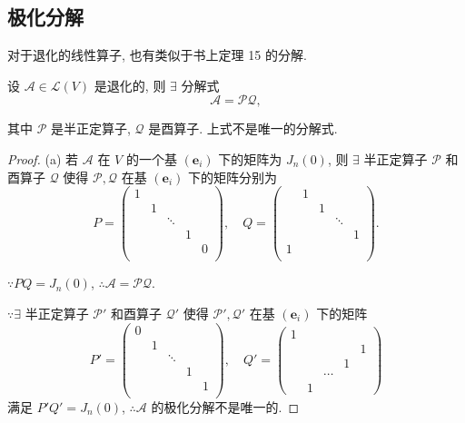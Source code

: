 \documentclass[color=black,device=normal,lang=cn,mode=geye]{elegantnote}
\begin{document}
\subsection{极化分解}
对于退化的线性算子, 也有类似于书上定理 15 的分解.
\begin{theorem}
    设 $\mathcal{A}\in\mathcal{L}(V)$ 是退化的, 则 $\exists$ 分解式
    \[\mathcal{A}=\mathcal{PQ},\]

    其中 $\mathcal{P}$ 是半正定算子, $\mathcal{Q}$ 是酉算子. 上式不是唯一的分解式.
\end{theorem}
\begin{proof}
    (a) 若 $\mathcal{A}$ 在 $V$ 的一个基 $(\boldsymbol{e}_i)$ 下的矩阵为 $J_n(0)$, 则 $\exists$ 半正定算子 $\mathcal{P}$ 和酉算子 $\mathcal{Q}$ 使得 $\mathcal{P},\mathcal{Q}$ 在基 $(\boldsymbol{e}_i)$ 下的矩阵分别为
    \[P=\begin{pmatrix}
        1 \\
        & 1 \\
        && \ddots \\
        &&& 1 \\
        &&&& 0 \\
    \end{pmatrix},\quad Q=\begin{pmatrix}
        & 1 \\
        && 1 \\
        &&& \ddots \\
        &&&& 1 \\
        1 \\
    \end{pmatrix}.\]

    $\because PQ=J_n(0)$, $\therefore\mathcal{A}=\mathcal{PQ}$.

    $\because\exists$ 半正定算子 $\mathcal{P}'$ 和酉算子 $\mathcal{Q}'$ 使得 $\mathcal{P}',\mathcal{Q}'$ 在基 $(\boldsymbol{e}_i)$ 下的矩阵
    \[P'=\begin{pmatrix}
        0 \\
        & 1 \\
        && \ddots \\
        &&& 1 \\
        &&&& 1 \\
    \end{pmatrix},\quad Q'=\begin{pmatrix}
        1 \\
        &&&& 1 \\
        &&& 1 \\
        && \cdots \\
        & 1
    \end{pmatrix}\]
    满足 $P'Q'=J_n(0)$, $\therefore\mathcal{A}$ 的极化分解不是唯一的.


\end{proof}
\end{document}
